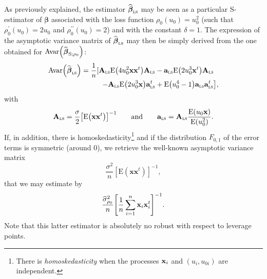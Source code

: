 \begin{stremark}
As previously explained, the  estimator $\sthat{\boldsymbol\beta%
}_{\stsc{LS}}$ may be seen as a particular S-estimator of $\boldsymbol{\beta
}$ associated with the loss function $\rho_{0}\left(  u_{0}\right)  =u_{0}%
^{2}$ (such that $\rho_{0}^{\prime}\left(  u_{0}\right)  =2u_{0}$ and
$\rho_{0}^{\prime\prime}\left(  u_{0}\right)  =2$) and with the constant
$\delta=1$. The expression of the asymptotic variance matrix of $\widehat
{\boldsymbol\beta}_{\stsc{LS}}$ may then be simply derived from the one
obtained for $\mathrm{Avar}\left(  \sthat{\boldsymbol\beta}_{\mathrm{S}%
;\rho_{0}}\right)  $:%
\begin{align}
\mathrm{Avar}\left(  \sthat{\boldsymbol\beta}_{\stsc{LS}}\right)   &
=\frac{1}{n}[\mathbf{A}_{\stsc{LS}}\mathrm{E}\left(  4u_{0}^{2}%
\mathbf{xx}^{t}\right)  \mathbf{A}_{\stsc{LS}}-\mathbf{a}_{\stsc{LS}%
}\mathrm{E}\left(  2u_{0}^{3}\stvec{x}^{t}\right)  \mathbf{A}_{\stsc{LS}%
}\label{eq:Avar_betahat_LS}\\
&  \hspace*{1cm}\left.  -\mathbf{A}_{\stsc{LS}}\mathrm{E}\left(  2u_{0}%
^{3}\stvec{x}\right)  \mathbf{a}_{\stsc{LS}}^{t}+\mathrm{E}\left(
u_{0}^{4}-1\right)  \mathbf{a}_{\stsc{LS}}\mathbf{a}_{\stsc{LS}}%
^{t}\right]  ,\nonumber
\end{align}
with%
\begin{equation}
\mathbf{A}_{\stsc{LS}}=\frac{\sigma}{2}\left[  \mathrm{E}\left(
\mathbf{xx}^{t}\right)  \right]  ^{-1}\qquad\text{and}\qquad\mathbf{a}%
_{\stsc{LS}}=\mathbf{A}_{\stsc{LS}}\frac{\mathrm{E}\left(  u_{0}%
\stvec{x}\right)  }{\mathrm{E}\left(  u_{0}^{2}\right)  }. \label{eq:A_a_LS}%
\end{equation}
If, in addition, there is homoskedasticity\footnote{There is
\emph{homoskedasticity} when the processes $\mathbf x_{i}$ and $\left(
u_{i},u_{0i}\right)  $ are independent.} and if the distribution $F_{0,1}$ of
the error terms is symmetric (around 0), we retrieve the well-known asymptotic
variance matrix
\[
\frac{\sigma^{2}}{n}\left[  \mathrm{E}\left(  \mathbf{xx}^{t}\right)  \right]
^{-1},
\]
that we may estimate by
\[
\frac{\sthat{\sigma}_{\rho_{0}}^{2}}{n}\left[  \frac{1}{n}\sum_{i=1}%
^{n}\stvec{x}_{i}\stvec{x}_{i}^{t}\right]  ^{-1}.
\]
Note that this latter estimator is absolutely no robust with respect to
leverage points.


\end{stremark}
